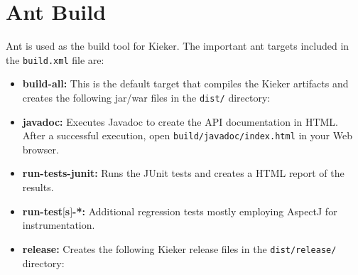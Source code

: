 \section{Ant Build}

Ant is used as the build tool for Kieker. %
The important ant targets included in the \texttt{build.xml} file are:

\begin{itemize}
\item \textbf{build-all:} This is the default target that compiles the Kieker %
artifacts and creates the following jar/war files in the \texttt{dist/} directory:
\item \textbf{javadoc:} Executes Javadoc to create the API documentation in HTML. %
After a successful execution, open \texttt{build/javadoc/index.html} in your %
Web browser.
\item \textbf{run-tests-junit:} Runs the JUnit tests and creates a HTML report %
of the results. 
\item \textbf{run-test$[$s$]$-*:} Additional regression tests mostly employing %
AspectJ for instrumentation. 
\item \textbf{release:} Creates the following Kieker release files in the %
\texttt{dist/release/} directory:
\end{itemize}

